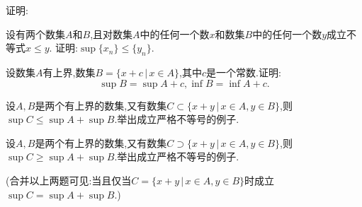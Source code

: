 \documentclass{exam}
\begin{document}
\begin{questions}

    \question
    证明:

    \question
    设有两个数集$A$和$B$,且对数集$A$中的任何一个数$x$和数集$B$中的任何一个数$y$成立不等式$x\leqslant y$.
    证明:$\sup\{x_n\}\leqslant\{y_n\}$.

    \question
    设数集$A$有上界,数集$B=\{x+c\,\lvert\, x\in A\}$,其中$c$是一个常数.证明:
    \[\sup B=\sup A+c,\inf B=\inf A+c.
        \]

    \question
    设$A,B$是两个有上界的数集,又有数集$C\subset \{x+y\,\lvert\, x\in A,y\in B\}$,则
    $\sup C\leqslant \sup A+\sup B$.举出成立严格不等号的例子.

    \question
    设$A,B$是两个有上界的数集,又有数集$C\supset  \{x+y\,\lvert\, x\in A,y\in B\}$,则
    $\sup C\geqslant \sup A+\sup B$.举出成立严格不等号的例子.
    \begin{solution}
        

        (合并以上两题可见:当且仅当$C=\{x+y\,\lvert\, x\in A,y\in B\}$时成立$\sup C=\sup A+\sup B$.)
    \end{solution}

\end{questions}
\end{document}
